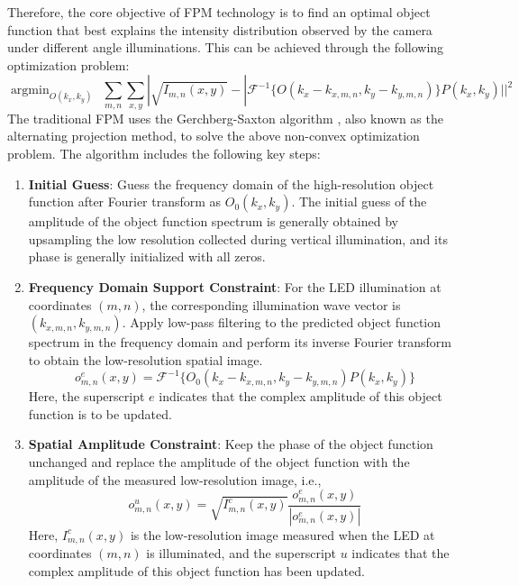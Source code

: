 \documentclass[journal,review,submit,pdftex,moreauthors]{Definitions/mdpi}
\begin{document}
Therefore, the core objective of FPM technology is to find an optimal object function that best explains the intensity distribution observed by the camera under different angle illuminations. This can be achieved through the following optimization problem:
\begin{equation}
\mathop{\arg\min}_{O(k_x,k_y)} \ \ \sum_{m,n}\sum_{x,y}|\sqrt{I_{m,n}(x,y)}-|\mathscr{F}^{-1}\{O(k_x-k_{x,m,n},k_y-k_{y,m,n})\}P(k_x,k_y)||^2
\end{equation}
The traditional FPM uses the Gerchberg-Saxton algorithm \cite{gerchberg1971phase}, also known as the alternating projection method, to solve the above non-convex optimization problem. The algorithm includes the following key steps:

\begin{enumerate}
    \item \textbf{Initial Guess}: Guess the frequency domain of the high-resolution object function after Fourier transform as $O_0(k_x,k_y)$. The initial guess of the amplitude of the object function spectrum is generally obtained by upsampling the low resolution collected during vertical illumination, and its phase is generally initialized with all zeros.
    
    \item \textbf{Frequency Domain Support Constraint}: For the LED illumination at coordinates $(m,n)$, the corresponding illumination wave vector is $(k_{x,m,n},k_{y,m,n})$. Apply low-pass filtering to the predicted object function spectrum in the frequency domain and perform its inverse Fourier transform to obtain the low-resolution spatial image.
    \begin{equation}
    o^e_{m,n}(x,y)=\mathscr{F}^{-1}\{O_0(k_x-k_{x,m,n},k_y-k_{y,m,n})P(k_x,k_y)\}
    \end{equation}
    Here, the superscript $e$ indicates that the complex amplitude of this object function is to be updated.
    
    \item \textbf{Spatial Amplitude Constraint}: Keep the phase of the object function unchanged and replace the amplitude of the object function with the amplitude of the measured low-resolution image, i.e.,
    \begin{equation}
    o^u_{m,n}(x,y)=\sqrt{I^c_{m,n}(x,y)}\frac{o^e_{m,n}(x,y)}{|o^e_{m,n}(x,y)|}
    \end{equation}
    Here, $I^c_{m,n}(x,y)$ is the low-resolution image measured when the LED at coordinates $(m,n)$ is illuminated, and the superscript $u$ indicates that the complex amplitude of this object function has been updated.
    

\end{enumerate}
\end{document}
